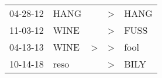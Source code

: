 \begin{supertabular}{p{0.07\textwidth}p{0.06\textwidth}p{0.02\textwidth}p{0.02\textwidth}p{0.06\textwidth}}
 04-28-12\textsuperscript{} &  HANG\textsuperscript{} &               &  \textgreater &  HANG\textsuperscript{} \\
 11-03-12\textsuperscript{} &  WINE\textsuperscript{} &               &  \textgreater &  FUSS\textsuperscript{} \\
 04-13-13\textsuperscript{} &  WINE\textsuperscript{} &  \textgreater &  \textgreater &  fool\textsuperscript{} \\
 10-14-18\textsuperscript{} &  reso\textsuperscript{} &               &  \textgreater &  BILY\textsuperscript{} \\
\end{supertabular}
